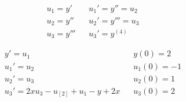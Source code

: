 		\begin{align}
			&u_{1} = y'& &u_{1}' = y'' = u_{2}& \\
			&u_{2} = y''& &u_{2}' = y''' = u_{3}& \\
			&u_{3} = y'''& &u_{3}' = y^{(4)}&
		\end{align}

		\begin{align}
			&y' = u_{1}& &y(0) = 2& \\
			&u_{1}' = u_{2}& &u_{1}(0) = -1 \\
			&u_{2}' = u_{3}& &u_{2}(0) = 1&\\
			&u_{3}' = 2xu_{3} - u_[2] + u_{1} - y + 2x& &u_{3}(0) = 2&
		\end{align}
